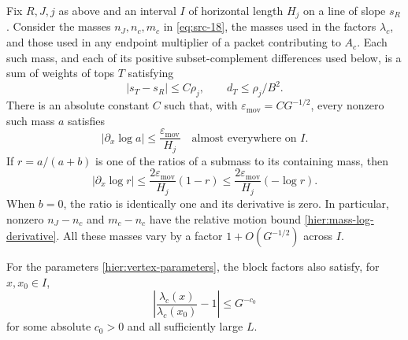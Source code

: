 \begin{lemma}
\label{hier:mass-motion}
Fix $R,J,j$ as above and an interval $I$ of horizontal length $H_j$ on a
line of slope $s_R$.  Consider the masses $n_J,n_c,m_c$ in
\eqref{eq:src-18}, the masses used in the factors $\lambda_c$, and those
used in any endpoint multiplier of a packet contributing to $A_c$.
Each such mass, and each of its positive subset-complement differences
used below, is a sum of weights of tops $T$ satisfying
\begin{equation}
 |s_T-s_R|\le C\rho_j,
 \qquad d_T\le\rho_j/B^2.
 \label{hier:motion-locality}
\end{equation}
There is an absolute constant $C$ such that, with
$\varepsilon_{\mathrm{mov}}=C G^{-1/2}$, every nonzero such mass $a$ satisfies
\begin{equation}
 |\partial_x\log a|\le\frac{\varepsilon_{\mathrm{mov}}}{H_j}
 \quad\text{almost everywhere on }I.
 \label{hier:mass-log-derivative}
\end{equation}
If $r=a/(a+b)$ is one of the ratios of a submass to its containing mass,
then
\begin{equation}
 |\partial_x\log r|
 \le\frac{2\varepsilon_{\mathrm{mov}}}{H_j}(1-r)
 \le\frac{2\varepsilon_{\mathrm{mov}}}{H_j}(-\log r).
 \label{hier:ratio-derivative}
\end{equation}
When $b=0$, the ratio is identically one and its derivative is zero.
In particular, nonzero $n_J-n_c$ and $m_c-n_c$ have the relative motion
bound \eqref{hier:mass-log-derivative}.  All these masses vary by a
factor $1+O(G^{-1/2})$ across $I$.

For the parameters \eqref{hier:vertex-parameters}, the block
factors also satisfy, for $x,x_0\in I$,
\begin{equation}
 \left|\frac{\lambda_c(x)}{\lambda_c(x_0)}-1\right|
 \le G^{-c_0}
 \label{hier:complex-transition-motion}
\end{equation}
for some absolute $c_0>0$ and all sufficiently large $L$.
\end{lemma}

